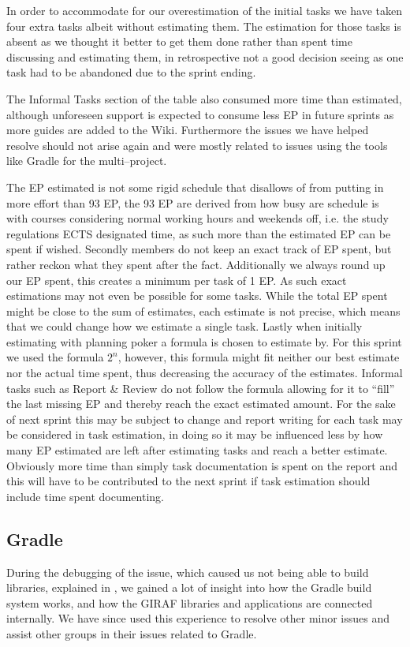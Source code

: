 In order to accommodate for our overestimation of the initial tasks we have taken four extra tasks albeit without estimating them.
The estimation for those tasks is absent as we thought it better to get them done rather than spent time discussing and estimating them, in retrospective not a good decision seeing as one task had to be abandoned due to the sprint ending.

The Informal Tasks section of the table also consumed more time than estimated, although unforeseen support is expected to consume less EP in future sprints as more guides are added to the Wiki.
Furthermore the issues we have helped resolve should not arise again and were mostly related to issues using the tools like Gradle for the multi--project.

The EP estimated is not some rigid schedule that disallows of from putting in more effort than 93 EP, the 93 EP are derived from how busy are schedule is with courses considering normal working hours and weekends off, i.e. the study regulations ECTS designated time, as such more than the estimated EP can be spent if wished.
Secondly members do not keep an exact track of EP spent, but rather reckon what they spent after the fact.
Additionally we always round up our EP spent, this creates a minimum per task of 1 EP.
As such exact estimations may not even be possible for some tasks.
While the total EP spent might be close to the sum of estimates, each estimate is not precise, which means that we could change how we estimate a single task.
Lastly when initially estimating with planning poker a formula is chosen to estimate by.
For this sprint we used the formula $2^n$, however, this formula might fit neither our best estimate nor the actual time spent, thus decreasing the accuracy of the estimates.
Informal tasks such as Report \& Review do not follow the formula allowing for it to \enquote{fill} the last missing EP and thereby reach the exact estimated amount.
For the sake of next sprint this may be subject to change and report writing for each task may be considered in task estimation, in doing so it may be influenced less by how many EP estimated are left after estimating tasks and reach a better estimate.
Obviously more time than simply task documentation is spent on the report and this will have to be contributed to the next sprint if task estimation should include time spent documenting.

\subsection{Gradle}
During the debugging of the issue, which caused us not being able to build libraries, explained in , we gained a lot of insight into how the Gradle build system works, and how the GIRAF libraries and applications are connected internally.
We have since used this experience to resolve other minor issues and assist other groups in their issues related to Gradle.

